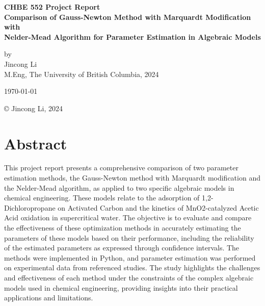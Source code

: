 \documentclass[12pt]{article} %
\begin{document}
\setlength{\parskip}{1em} 
\setlength{\parindent}{0pt}
\newcommand{\vect}[1]{\mathbf{#1}}

\begin{titlepage}  %
    \centering    %

    \vspace*{2cm}
    
    \normalsize \textbf{CHBE 552 Project Report} \\
    \vspace{0.5cm}  %
    \normalsize\textbf{Comparison of Gauss-Newton Method with Marquardt Modification with \\
     Nelder-Mead Algorithm for Parameter Estimation in Algebraic Models} \\
    \vspace{2cm}  %
    
    \normalsize by\\
    \vspace{1cm}
    \normalsize Jincong Li \\ 
    \vspace{1cm}
    \normalsize M.Eng, The University of British Columbia, 2024
    \vspace{11cm}  %
    
    \normalsize \today

    \vfill  %
    © Jincong Li, 2024
\end{titlepage}
\tableofcontents
\newpage
\section{Abstract}
This project report presents a comprehensive comparison of two parameter estimation methods, the Gauss-Newton method with Marquardt modification and the Nelder-Mead algorithm, as applied to two specific algebraic models in chemical engineering. These models relate to the adsorption of 1,2-Dichloropropane on Activated Carbon and the kinetics of MnO2-catalyzed Acetic Acid oxidation in supercritical water. The objective is to evaluate and compare the effectiveness of these optimization methods in accurately estimating the parameters of these models based on their performance, including the reliability of the estimated parameters as expressed through confidence intervals. The methods were implemented in Python, and parameter estimation was performed on experimental data from referenced studies. The study highlights the challenges and effectiveness of each method under the constraints of the complex algebraic models used in chemical engineering, providing insights into their practical applications and limitations.
\end{document}
